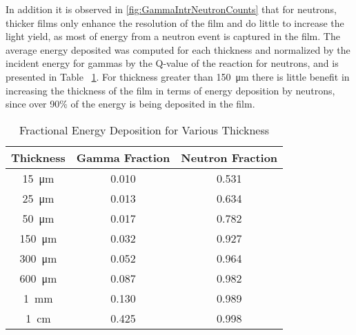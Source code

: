 In addition it is observed in \autoref{fig:GammaIntrNeutronCounts} that for neutrons, thicker films only enhance the resolution of the film and do little to increase the light yield, as most of energy from a neutron event is captured in the film.
The average energy deposited was computed for each thickness and normalized by the incident energy for gammas by the Q-value of the reaction for neutrons, and is presented in Table ~\ref{tab:FractionEDep}.
For thickness greater than \SI{150}{\um} there is little benefit in increasing the thickness of the film in terms of energy deposition by neutrons, since over 90\% of the energy is being deposited in the film.
\begin{table}[ht]
    \caption{Fractional Energy Deposition for Various Thickness}
	\centering
	\begin{tabular}{c | c c}
	Thickness & Gamma Fraction & Neutron Fraction \\
	\hline
	\hline
	\SI{15}{\um} & 0.010 & 0.531 \\
	\SI{25}{\um} & 0.013 & 0.634 \\
	\SI{50}{\um} & 0.017 & 0.782 \\
	\SI{150}{\um} & 0.032 & 0.927 \\
	\SI{300}{\um} & 0.052 & 0.964 \\
	\SI{600}{\um} & 0.087 & 0.982 \\
	\SI{1}{\mm} & 0.130 & 0.989 \\
	\SI{1}{\cm} & 0.425 & 0.998 \\
	\end{tabular}
  \label{tab:FractionEDep}
\end{table}

